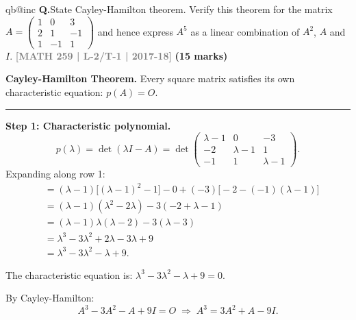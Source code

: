 \documentclass[12pt,a3paper]{article}
\makeatletter
\newcommand{\yr}[1]{\hfill\textcolor{gray}{\small\textbf{[#1]}}}
\newcommand{\mk}[1]{\textcolor{orange!70!black}{\small\textbf{(#1 marks)}}}
\newcounter{qnum}
\newcommand{\Q}[1]{%
  \csname qb@inc\endcsname
  \needspace{4\baselineskip}
  \refstepcounter{qnum}
  \vspace{6pt}
  \noindent\textbf{Q\theqnum.}\enspace #1\par
}
\makeatother
\begin{document}
\Q{State Cayley-Hamilton theorem. Verify this theorem for the matrix $A = \begin{pmatrix} 1 & 0 & 3 \\ 2 & 1 & -1 \\ 1 & -1 & 1 \end{pmatrix}$ and hence express $A^5$ as a linear combination of $A^2$, $A$ and $I$.
\yr{MATH 259 | L-2/T-1 | 2017-18} \mk{15}}



\begin{tcolorbox}[enhanced,breakable,
  colback=cB!4,colframe=cB,boxrule=0.8pt,arc=5pt,
  title={\textbf{Answer --- Cayley-Hamilton; $A^5$ as Linear Combination for
    $A=\begin{pmatrix}1&0&3\\2&1&-1\\1&-1&1\end{pmatrix}$}},
  fonttitle=\bfseries\color{white},colbacktitle=cB]

\textbf{Cayley-Hamilton Theorem.} Every square matrix satisfies its own
characteristic equation: $p(A)=O$.

\medskip\textcolor{cB}{\rule{\textwidth}{0.4pt}}

\textbf{Step 1: Characteristic polynomial.}
\[
  p(\lambda)=\det(\lambda I-A)
  =\det\begin{pmatrix}\lambda-1&0&-3\\-2&\lambda-1&1\\-1&1&\lambda-1\end{pmatrix}.
\]
Expanding along row 1:
\begin{align*}
  &=(\lambda-1)\bigl[(\lambda-1)^2-1\bigr]-0+(-3)\bigl[-2-(-1)(\lambda-1)\bigr]\\
  &=(\lambda-1)(\lambda^2-2\lambda)-3(-2+\lambda-1)\\
  &=(\lambda-1)\lambda(\lambda-2)-3(\lambda-3)\\
  &=\lambda^3-3\lambda^2+2\lambda-3\lambda+9\\
  &=\lambda^3-3\lambda^2-\lambda+9.
\end{align*}

The characteristic equation is: $\lambda^3-3\lambda^2-\lambda+9=0$.

By Cayley-Hamilton:
\[
  \boxed{A^3 - 3A^2 - A + 9I = O \;\Longrightarrow\; A^3 = 3A^2 + A - 9I.}
\]


\end{tcolorbox}
\end{document}
